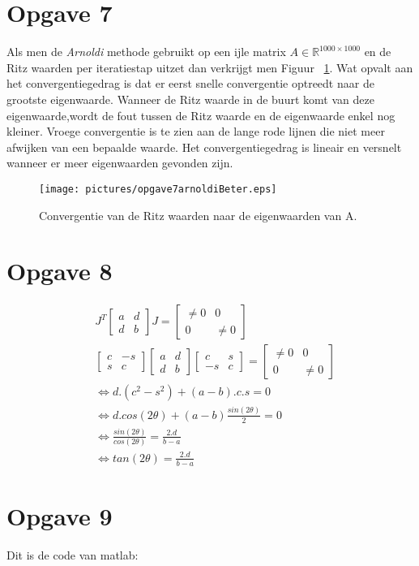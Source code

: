 \documentclass[a4paper]{article}
\newcommand{\opgave}[1]{\section*{Opgave #1}}
\begin{document}
\opgave{7}
Als men de \textit{Arnoldi} methode gebruikt op een ijle matrix $A \in \mathbb{R}^{1000\times1000}$ en de Ritz waarden per iteratiestap uitzet dan verkrijgt men Figuur ~\ref{fig:opgave7}.
Wat opvalt aan het convergentiegedrag is dat er eerst snelle convergentie optreedt naar de grootste eigenwaarde. Wanneer de Ritz waarde in de buurt komt van deze eigenwaarde,wordt de fout tussen de Ritz waarde en de eigenwaarde enkel nog kleiner. Vroege convergentie is te zien aan de lange rode lijnen die niet meer afwijken van een bepaalde waarde. Het convergentiegedrag is lineair en versnelt wanneer er meer eigenwaarden gevonden zijn.
\begin{figure}
\centerline{\texttt{[image: pictures/opgave7arnoldiBeter.eps]}}
\caption{Convergentie van de Ritz waarden naar de eigenwaarden van A.}
\label{fig:opgave7}
\end{figure}

\opgave{8}
\begin{algorithmic}
\State
\begin{align*}
&J^{T}
\begin{bmatrix} 
a & d \\
d & b 
\end{bmatrix}
J
=
\begin{bmatrix} 
\neq 0 & 0 \\
0 & \neq 0
\end{bmatrix}\\
&\begin{bmatrix} 
c & -s \\
s & c
\end{bmatrix}
\begin{bmatrix} 
a & d \\
d & b 
\end{bmatrix}
\begin{bmatrix} 
c & s \\
-s & c 
\end{bmatrix}
=
\begin{bmatrix} 
\neq 0 & 0 \\
0 & \neq 0
\end{bmatrix}\\
&\Leftrightarrow d.(c^2-s^2)+(a-b).c.s = 0 \\
 &\Leftrightarrow d. cos(2\theta)+(a-b) \frac{sin(2\theta)}{2}= 0\\
 &\Leftrightarrow \frac{sin(2\theta)}{cos(2\theta)} = \frac{2.d}{b-a}\\
 &\Leftrightarrow tan(2\theta) = \frac{2.d}{b-a}
\end{align*}

\end{algorithmic}
\opgave{9}
Dit is de code van matlab:

\end{document}
